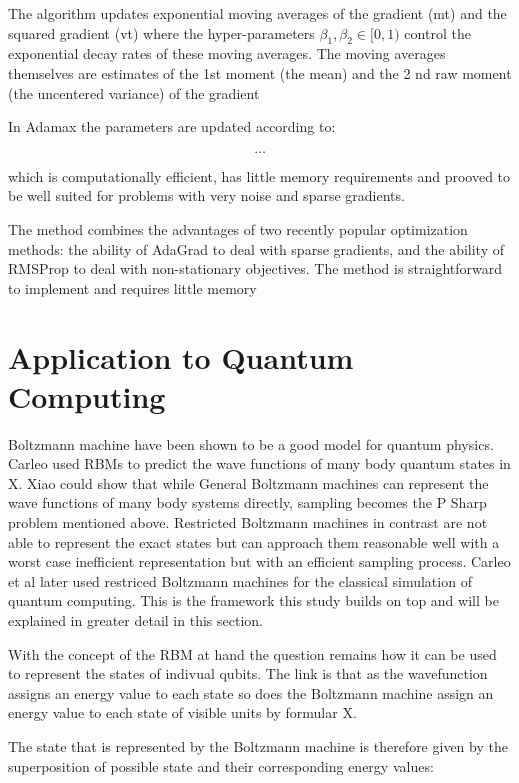 The algorithm updates exponential moving averages of the gradient (mt) and the squared gradient
(vt) where the hyper-parameters $\beta_1, \beta_2 \in [0, 1)$ control the exponential decay rates of these moving
averages. The moving averages themselves are estimates of the 1st moment (the mean) and the
2
nd raw moment (the uncentered variance) of the gradient

In Adamax the 
parameters are updated according to:

\begin{equation}
    \dots
\end{equation}

which is computationally efficient, has little memory requirements and prooved to be well suited 
for problems with very noise and sparse gradients.

The method combines the advantages of
two recently popular optimization methods: the ability of AdaGrad to deal with sparse gradients,
and the ability of RMSProp to deal with non-stationary objectives. The method is straightforward
to implement and requires little memory

\section{Application to Quantum Computing}
\label{sec:applicationToQuantumComputing}
Boltzmann machine have been shown to be a good model for quantum physics. Carleo used RBMs to predict the wave functions 
of many body quantum states in X. Xiao could show that while General Boltzmann machines can represent the wave functions of 
many body systems directly, sampling becomes the P Sharp problem mentioned above. Restricted Boltzmann machines in contrast 
are not able to represent the exact states but can approach them reasonable well with a worst case inefficient representation 
but with an efficient sampling process. Carleo et al later used restriced Boltzmann machines for the classical simulation of 
quantum computing. This is the framework this study builds on top and will be explained in greater detail in this section.

With the concept of the RBM at hand the question remains how it can be used to represent the states of indivual qubits. The
link is that as the wavefunction assigns an energy value to each state so does the Boltzmann machine assign an energy value 
to each state of visible units by formular X.

The state that is represented by the Boltzmann machine is therefore given by the superposition of possible state and their 
corresponding energy values:

